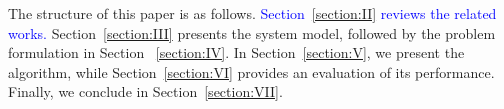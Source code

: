 \documentclass[12pt,draftclsnofoot,onecolumn]{IEEEtran}
\begin{document}
\begin{itemize}
	
	
	
	
	
\end{itemize}
The structure of this paper is as follows.  \textcolor{blue}{Section~\ref{section:II} reviews the related works.} Section~\ref{section:III} presents the system model, followed by the problem formulation in Section ~\ref{section:IV}. In Section~\ref{section:V}, we present the algorithm, while Section~\ref{section:VI} provides an evaluation of its performance. Finally, we conclude in Section~\ref{section:VII}. \color{blue}



	
\end{document}
